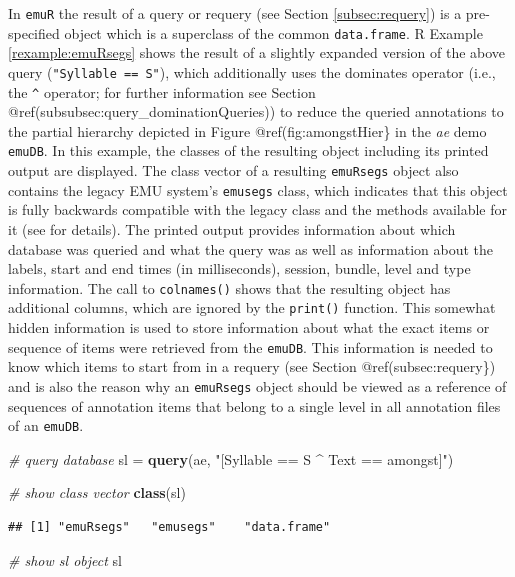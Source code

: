 \documentclass[]{book}
\newenvironment{Shaded}{\begin{snugshade}}{\end{snugshade}}
\newcommand{\CommentTok}[1]{\textcolor[rgb]{0.56,0.35,0.01}{\textit{#1}}}
\newcommand{\KeywordTok}[1]{\textcolor[rgb]{0.13,0.29,0.53}{\textbf{#1}}}
\newcommand{\NormalTok}[1]{#1}
\newcommand{\StringTok}[1]{\textcolor[rgb]{0.31,0.60,0.02}{#1}}
\theoremstyle{definition}
\theoremstyle{definition}
\theoremstyle{definition}
\theoremstyle{remark}
\begin{document}
In \texttt{emuR} the result of a query or requery (see Section
\ref{subsec:requery}) is a pre-specified object which is a superclass of
the common \texttt{data.frame}. R Example \ref{rexample:emuRsegs} shows
the result of a slightly expanded version of the above query
(\texttt{"Syllable\ ==\ S"}), which additionally uses the dominates
operator (i.e., the \texttt{\^{}} operator; for further information see
Section @ref(subsubsec:query\_dominationQueries)) to reduce the queried
annotations to the partial hierarchy depicted in Figure
@ref(fig:amongstHier\} in the \emph{ae} demo \texttt{emuDB}. In this
example, the classes of the resulting object including its printed
output are displayed. The class vector of a resulting \texttt{emuRsegs}
object also contains the legacy EMU system's \texttt{emusegs} class,
which indicates that this object is fully backwards compatible with the
legacy class and the methods available for it (see
\citet{harrington:2010a} for details). The printed output provides
information about which database was queried and what the query was as
well as information about the labels, start and end times (in
milliseconds), session, bundle, level and type information. The call to
\texttt{colnames()} shows that the resulting object has additional
columns, which are ignored by the \texttt{print()} function. This
somewhat hidden information is used to store information about what the
exact items or sequence of items were retrieved from the \texttt{emuDB}.
This information is needed to know which items to start from in a
requery (see Section @ref(subsec:requery\}) and is also the reason why
an \texttt{emuRsegs} object should be viewed as a reference of sequences
of annotation items that belong to a single level in all annotation
files of an \texttt{emuDB}.

\begin{Shaded}
\begin{Highlighting}[]
\CommentTok{# query database}
\NormalTok{sl =}\StringTok{ }\KeywordTok{query}\NormalTok{(ae, }\StringTok{"[Syllable == S ^ Text == amongst]"}\NormalTok{)}

\CommentTok{# show class vector}
\KeywordTok{class}\NormalTok{(sl)}
\end{Highlighting}
\end{Shaded}

\begin{verbatim}
## [1] "emuRsegs"   "emusegs"    "data.frame"
\end{verbatim}

\begin{Shaded}
\begin{Highlighting}[]
\CommentTok{# show sl object}
\NormalTok{sl}
\end{Highlighting}
\end{Shaded}
\end{document}
